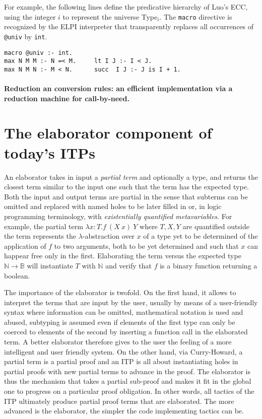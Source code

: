 \documentclass{easychair}
\begin{document}
For example, the following lines define the predicative hierarchy of Luo's ECC,
using the integer $i$ to represent the universe Type$_i$. The \verb+macro+
directive is recognized by the ELPI interpreter that transparently replaces all
occurrences of \verb+@univ+ by \verb+int+.
\begin{Verbatim}
macro @univ :- int.
max N M M :- N =< M.     lt I J :- I < J.
max N M N :- M < N.      succ  I J :- J is I + 1.
\end{Verbatim}

\paragraph{Reduction an conversion rules: an efficient implementation via a reduction machine for call-by-need.}\label{sec:kernelmachine}



\section{The elaborator component of today's ITPs}\label{sec:elaborator}

An elaborator takes in input a \emph{partial term} and optionally a
type, and returns the closest term similar to the input one such that
the term has the expected type. Both the input and output terms are
partial in the sense that subterms can be omitted and replaced with
named holes to be later filled in or, in logic programming
terminology, with \emph{existentially quantified metavariables}. For
example, the partial term $\lambda x: T. f~(X~x)~Y$ where $T,X,Y$ are
quantified outside the term represents the $\lambda$-abstraction over
$x$ of a type yet to be determined of the application of $f$ to two
arguments, both to be yet determined and such that $x$ can happear
free only in the first. Elaborating the term versus the expected type
$\mathbb{N} \to \mathbb{B}$ will instantiate $T$ with $\mathbb{N}$ and
verify that $f$ is a binary function returning a boolean.

The importance of the elaborator is twofold. On the first hand, it
allows to interpret the terms that are input by the user, usually by
means of a user-friendly syntax where information can be omitted,
mathematical notation is used and abused, subtyping is assumed even if
elements of the first type can only be coerced to elements of the
second by inserting a function call in the elaborated term. A better
elaborator therefore gives to the user the feeling of a more
intelligent and user friendly system. On the other hand, via
Curry-Howard, a partial term is a partial proof and an ITP is all
about instantiating holes in partial proofs with new partial terms to
advance in the proof. The elaborator is thus the mechanism that takes
a partial sub-proof and makes it fit in the global one to progress on
a particular proof obligation. In other words, all tactics of the ITP
ultimately produce partial proof terms that are elaborated. The more
advanced is the elaborator, the simpler the code implementing tactics
can be.
\end{document}
